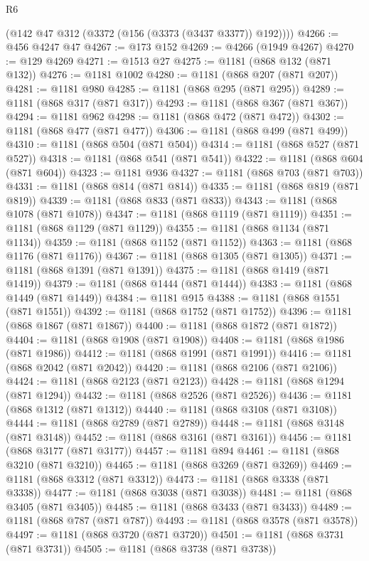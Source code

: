\begin{lexlean}{R6}
\begin{coremodule}
      (@142 @47 @312 (@3372 (@156 (@3373 (@3437 @3377)) @192))))
@4266 := @456 @4247 @47
@4267 := @173 @152
@4269 := @4266 (@1949 @4267)
@4270 := @129 @4269
@4271 := @1513 @27
@4275 := @1181 (@868 @132 (@871 @132))
@4276 := @1181 @1002
@4280 := @1181 (@868 @207 (@871 @207))
@4281 := @1181 @980
@4285 := @1181 (@868 @295 (@871 @295))
@4289 := @1181 (@868 @317 (@871 @317))
@4293 := @1181 (@868 @367 (@871 @367))
@4294 := @1181 @962
@4298 := @1181 (@868 @472 (@871 @472))
@4302 := @1181 (@868 @477 (@871 @477))
@4306 := @1181 (@868 @499 (@871 @499))
@4310 := @1181 (@868 @504 (@871 @504))
@4314 := @1181 (@868 @527 (@871 @527))
@4318 := @1181 (@868 @541 (@871 @541))
@4322 := @1181 (@868 @604 (@871 @604))
@4323 := @1181 @936
@4327 := @1181 (@868 @703 (@871 @703))
@4331 := @1181 (@868 @814 (@871 @814))
@4335 := @1181 (@868 @819 (@871 @819))
@4339 := @1181 (@868 @833 (@871 @833))
@4343 := @1181 (@868 @1078 (@871 @1078))
@4347 := @1181 (@868 @1119 (@871 @1119))
@4351 := @1181 (@868 @1129 (@871 @1129))
@4355 := @1181 (@868 @1134 (@871 @1134))
@4359 := @1181 (@868 @1152 (@871 @1152))
@4363 := @1181 (@868 @1176 (@871 @1176))
@4367 := @1181 (@868 @1305 (@871 @1305))
@4371 := @1181 (@868 @1391 (@871 @1391))
@4375 := @1181 (@868 @1419 (@871 @1419))
@4379 := @1181 (@868 @1444 (@871 @1444))
@4383 := @1181 (@868 @1449 (@871 @1449))
@4384 := @1181 @915
@4388 := @1181 (@868 @1551 (@871 @1551))
@4392 := @1181 (@868 @1752 (@871 @1752))
@4396 := @1181 (@868 @1867 (@871 @1867))
@4400 := @1181 (@868 @1872 (@871 @1872))
@4404 := @1181 (@868 @1908 (@871 @1908))
@4408 := @1181 (@868 @1986 (@871 @1986))
@4412 := @1181 (@868 @1991 (@871 @1991))
@4416 := @1181 (@868 @2042 (@871 @2042))
@4420 := @1181 (@868 @2106 (@871 @2106))
@4424 := @1181 (@868 @2123 (@871 @2123))
@4428 := @1181 (@868 @1294 (@871 @1294))
@4432 := @1181 (@868 @2526 (@871 @2526))
@4436 := @1181 (@868 @1312 (@871 @1312))
@4440 := @1181 (@868 @3108 (@871 @3108))
@4444 := @1181 (@868 @2789 (@871 @2789))
@4448 := @1181 (@868 @3148 (@871 @3148))
@4452 := @1181 (@868 @3161 (@871 @3161))
@4456 := @1181 (@868 @3177 (@871 @3177))
@4457 := @1181 @894
@4461 := @1181 (@868 @3210 (@871 @3210))
@4465 := @1181 (@868 @3269 (@871 @3269))
@4469 := @1181 (@868 @3312 (@871 @3312))
@4473 := @1181 (@868 @3338 (@871 @3338))
@4477 := @1181 (@868 @3038 (@871 @3038))
@4481 := @1181 (@868 @3405 (@871 @3405))
@4485 := @1181 (@868 @3433 (@871 @3433))
@4489 := @1181 (@868 @787 (@871 @787))
@4493 := @1181 (@868 @3578 (@871 @3578))
@4497 := @1181 (@868 @3720 (@871 @3720))
@4501 := @1181 (@868 @3731 (@871 @3731))
@4505 := @1181 (@868 @3738 (@871 @3738))

\end{coremodule}
\end{lexlean}

